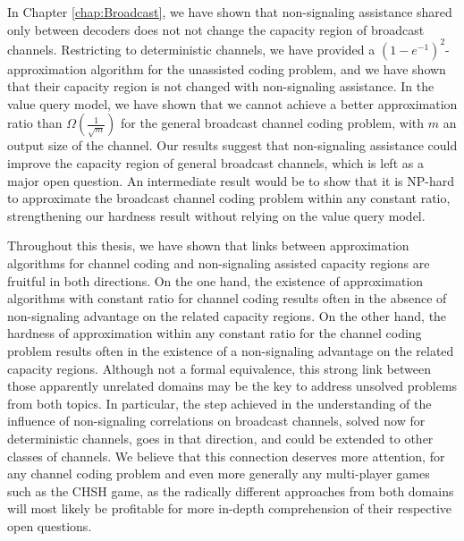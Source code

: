 In Chapter \ref{chap:Broadcast}, we have shown that non-signaling assistance shared only between decoders does not not change the capacity region of broadcast channels. Restricting to deterministic channels, we have provided a $(1-e^{-1})^2$-approximation algorithm for the unassisted coding problem, and we have shown that their capacity region is not changed with non-signaling assistance. In the value query model, we have shown that we cannot achieve a better approximation ratio than $\Omega\left(\frac{1}{\sqrt{m}}\right)$ for the general broadcast channel coding problem, with $m$ an output size of the channel. Our results suggest that non-signaling assistance could improve the capacity region of general broadcast channels, which is left as a major open question. An intermediate result would be to show that it is \textrm{NP}-hard to approximate the broadcast channel coding problem within any constant ratio, strengthening our hardness result without relying on the value query model.

Throughout this thesis, we have shown that links between approximation algorithms for channel coding and non-signaling assisted capacity regions are fruitful in both directions. On the one hand, the existence of approximation algorithms with constant ratio for channel coding results often in the absence of non-signaling advantage on the related capacity regions. On the other hand, the hardness of approximation within any constant ratio for the channel coding problem results often in the existence of a non-signaling advantage on the related capacity regions. Although not a formal equivalence, this strong link between those apparently unrelated domains may be the key to address unsolved problems from both topics. In particular, the step achieved in the understanding of the influence of non-signaling correlations on broadcast channels, solved now for deterministic channels, goes in that direction, and could be extended to other classes of channels. We believe that this connection deserves more attention, for any channel coding problem and even more generally any multi-player games such as the CHSH game, as the radically different approaches from both domains will most likely be profitable for more in-depth comprehension of their respective open questions.
